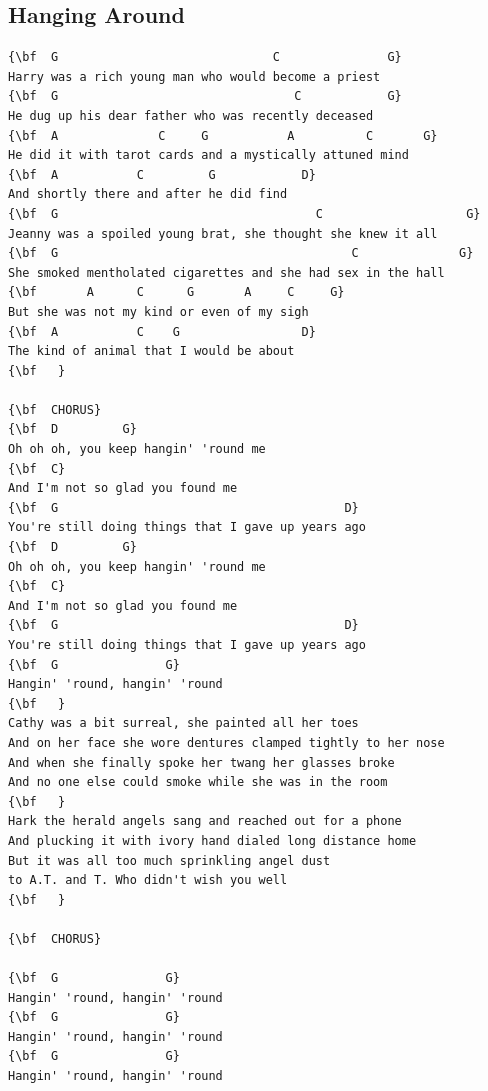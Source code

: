 \documentclass[a4paper]{article}
\begin{document}
\subsection{Hanging Around}
\begin{Verbatim}[commandchars=\\\{\}]
{\bf  G                              C               G}
Harry was a rich young man who would become a priest
{\bf  G                                 C            G}
He dug up his dear father who was recently deceased
{\bf  A              C     G           A          C       G}
He did it with tarot cards and a mystically attuned mind
{\bf  A           C         G            D}
And shortly there and after he did find
{\bf  G                                    C                    G}
Jeanny was a spoiled young brat, she thought she knew it all
{\bf  G                                         C              G}
She smoked mentholated cigarettes and she had sex in the hall
{\bf       A      C      G       A     C     G}
But she was not my kind or even of my sigh
{\bf  A           C    G                 D}
The kind of animal that I would be about
{\bf   }

{\bf  CHORUS}
{\bf  D         G}
Oh oh oh, you keep hangin' 'round me
{\bf  C}
And I'm not so glad you found me
{\bf  G                                        D}
You're still doing things that I gave up years ago
{\bf  D         G}
Oh oh oh, you keep hangin' 'round me
{\bf  C}
And I'm not so glad you found me
{\bf  G                                        D}
You're still doing things that I gave up years ago
{\bf  G               G}
Hangin' 'round, hangin' 'round
{\bf   }
Cathy was a bit surreal, she painted all her toes
And on her face she wore dentures clamped tightly to her nose
And when she finally spoke her twang her glasses broke
And no one else could smoke while she was in the room
{\bf   }
Hark the herald angels sang and reached out for a phone
And plucking it with ivory hand dialed long distance home
But it was all too much sprinkling angel dust
to A.T. and T. Who didn't wish you well
{\bf   }

{\bf  CHORUS}

{\bf  G               G}
Hangin' 'round, hangin' 'round
{\bf  G               G}
Hangin' 'round, hangin' 'round
{\bf  G               G}
Hangin' 'round, hangin' 'round

\end{Verbatim}
\newpage
\end{document}

